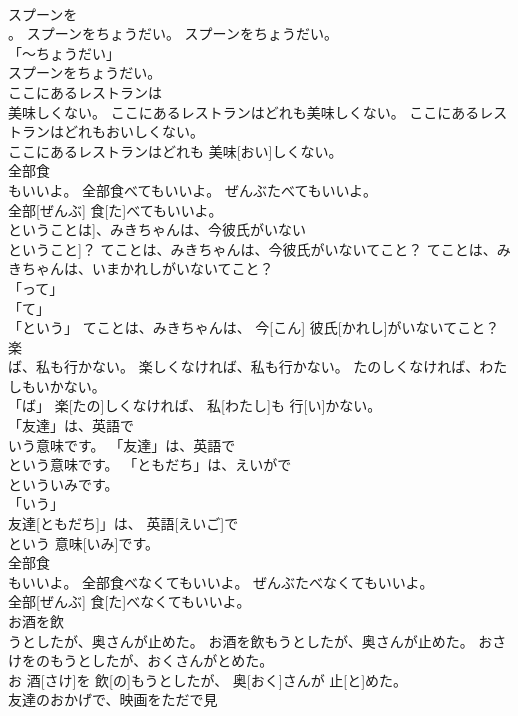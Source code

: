 \documentclass[8pt]{extreport}
\begin{document}
\begin{CJK}{UTF8}{min}
\\	スプーンを
\\	。	スプーンをちょうだい。	スプーンをちょうだい。	
\\	「～ちょうだい」 
\\	スプーンをちょうだい。		
\\	ここにあるレストランは
\\	美味しくない。	ここにあるレストランはどれも美味しくない。	ここにあるレストランはどれもおいしくない。	
\\	ここにあるレストランはどれも 美味[おい]しくない。		
\\	全部食
\\	もいいよ。	全部食べてもいいよ。	ぜんぶたべてもいいよ。	
\\	全部[ぜんぶ] 食[た]べてもいいよ。		
\\	ということは]、みきちゃんは、今彼氏がいない
\\	ということ]？	てことは、みきちゃんは、今彼氏がいないてこと？	てことは、みきちゃんは、いまかれしがいないてこと？	
\\	「って」 
\\	「て」 
\\	「という」	てことは、みきちゃんは、 今[こん] 彼氏[かれし]がいないてこと？		
\\	楽
\\	ば、私も行かない。	楽しくなければ、私も行かない。	たのしくなければ、わたしもいかない。	
\\	「ば」	楽[たの]しくなければ、 私[わたし]も 行[い]かない。		
\\	「友達」は、英語で
\\	いう意味です。	「友達」は、英語で
\\	という意味です。	「ともだち」は、えいがで
\\	といういみです。	
\\	「いう」 
\\	友達[ともだち]」は、 英語[えいご]で
\\	という 意味[いみ]です。		
\\	全部食
\\	もいいよ。	全部食べなくてもいいよ。	ぜんぶたべなくてもいいよ。	
\\	全部[ぜんぶ] 食[た]べなくてもいいよ。		
\\	お酒を飲
\\	うとしたが、奥さんが止めた。	お酒を飲もうとしたが、奥さんが止めた。	おさけをのもうとしたが、おくさんがとめた。	
\\	お 酒[さけ]を 飲[の]もうとしたが、 奥[おく]さんが 止[と]めた。		
\\	友達のおかげで、映画をただで見

\end{CJK}
\end{document}
